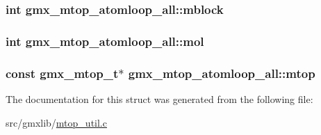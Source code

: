 \hypertarget{structgmx__mtop__atomloop__all_ab920c91aeda2fbfcfc7c5f2cea5fc257}{
\subsubsection[{mblock}]{\setlength{\rightskip}{0pt plus 5cm}int {\bf gmx\-\_\-mtop\-\_\-atomloop\-\_\-all\-::mblock}}}\label{structgmx__mtop__atomloop__all_ab920c91aeda2fbfcfc7c5f2cea5fc257}
\hypertarget{structgmx__mtop__atomloop__all_a6771617091fdd7a807d0d07e69d1b6cf}{
\subsubsection[{mol}]{\setlength{\rightskip}{0pt plus 5cm}int {\bf gmx\-\_\-mtop\-\_\-atomloop\-\_\-all\-::mol}}}\label{structgmx__mtop__atomloop__all_a6771617091fdd7a807d0d07e69d1b6cf}
\hypertarget{structgmx__mtop__atomloop__all_aad0d6e3298d0926999c181e3f68bcdc1}{
\subsubsection[{mtop}]{\setlength{\rightskip}{0pt plus 5cm}const {\bf gmx\-\_\-mtop\-\_\-t}$\ast$ {\bf gmx\-\_\-mtop\-\_\-atomloop\-\_\-all\-::mtop}}}\label{structgmx__mtop__atomloop__all_aad0d6e3298d0926999c181e3f68bcdc1}


\-The documentation for this struct was generated from the following file\-:\begin{DoxyCompactItemize}
\item 
src/gmxlib/\hyperlink{mtop__util_8c}{mtop\-\_\-util.\-c}\end{DoxyCompactItemize}
